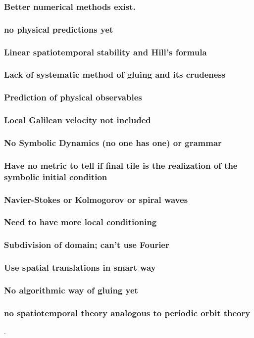 \documentclass{article}
\begin{document}
			\subsubsection{Better numerical methods exist.}
            \subsubsection{no physical predictions yet}
			\subsubsection{Linear spatiotemporal stability and Hill's formula}
			\subsubsection{Lack of systematic method of gluing and its crudeness}
			\subsubsection{Prediction of physical observables}
			\subsubsection{Local Galilean velocity not included}
			\subsubsection{No Symbolic Dynamics (no one has one) or grammar}
			\subsubsection{Have no metric to tell if final tile is the
					realization of the symbolic initial condition}
			\subsubsection{Navier-Stokes or Kolmogorov or spiral waves}
			\subsubsection{Need to have more local conditioning}
			\subsubsection{Subdivision of domain; can't use Fourier}
			\subsubsection{Use spatial translations in smart way}
			\subsubsection{No algorithmic way of gluing yet}
			\subsubsection{no spatiotemporal theory analogous to periodic orbit theory}.
\end{document}
